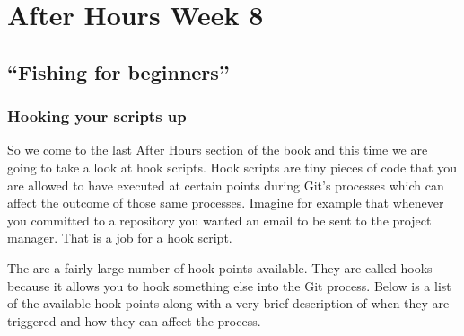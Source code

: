 \chapter{After Hours Week 8}
\section{``Fishing for beginners''}
\subsection{Hooking your scripts up}
So we come to the last After Hours section of the book and this time we are going to take a look at hook scripts.
Hook scripts are tiny pieces of code that you are allowed to have executed at certain points during Git's processes which can affect the outcome of those same processes.
Imagine for example that whenever you committed to a repository you wanted an email to be sent to the project manager.
That is a job for a hook script.

The are a fairly large number of hook points available.
They are called hooks because it allows you to hook something else into the Git process.
Below is a list of the available hook points along with a very brief description of when they are triggered and how they can affect the process.

